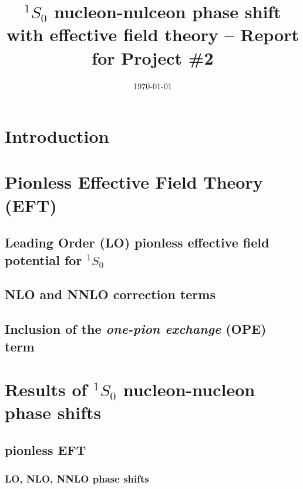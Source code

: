 \documentclass{article}
\begin{document}
\title{$^1S_0$ nucleon-nulceon phase shift with effective field theory -- Report for Project \#2}
\author{}
\date{\today}

\maketitle

\begin{abstract}

\end{abstract}

\begin{multicols}{2}

\section{Introduction}

\section{Pionless Effective Field Theory (EFT)}

\subsection{Leading Order (LO) pionless effective field potential for $^1S_0$}

\subsection{NLO and NNLO correction terms}

\subsection{Inclusion of the \emph{one-pion exchange} (OPE) term}

\section{Results of $^{1}S_{0}$ nucleon-nucleon phase shifts}

\subsection{pionless EFT}

\subsubsection{LO, NLO, NNLO phase shifts}


\end{multicols}
\end{document}
